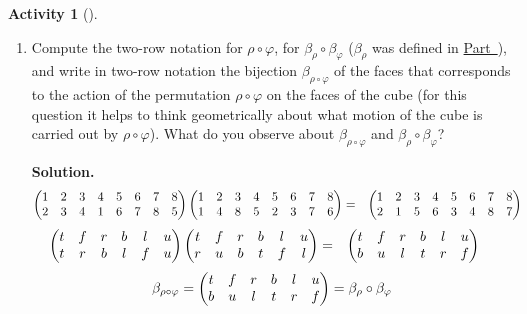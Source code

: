\documentclass[10pt,]{book}
\theoremstyle{plain}
\theoremstyle{definition}
\newtheorem{activity}[project]{Activity}
\numberwithin{equation}{chapter}
\newcommand{\amp}{&}
\begin{document}
\begin{activity}[]
\begin{enumerate}[label=(\alph*)]
~\par
\item Compute the two-row notation for \(\rho\circ\varphi\), for \(\beta_{\rho}\circ\beta_{\varphi}\) (\(\beta_{\rho}\) was defined in \hyperref[actsonparta]{Part~}), and write in two-row notation the bijection \(\beta_{\rho\circ\varphi}\) of the faces that corresponds to the action of the permutation \(\rho\circ\varphi\) on the faces of the cube (for this question it helps to think geometrically about what motion of the cube is carried out by \(\rho\circ\varphi\)).  What do you observe about \(\beta_{\rho\circ\varphi}\) and \(\beta_{\rho}\circ\beta_{\varphi}\)?%
\par\medskip\noindent%
\textbf{Solution.}\quad %
\begin{align*}
\begin{pmatrix}1\amp 2\amp 3\amp 4\amp 5\amp 6\amp 7\amp 8\cr
2\amp 3\amp 4\amp 1\amp 6\amp 7\amp 8\amp 5
\end{pmatrix} \begin{pmatrix}1\amp 2\amp 3\amp 4\amp 5\amp 6\amp 7\amp 8\cr1\amp 4\amp 8\amp 5\amp 2\amp 3\amp 7\amp 6
\end{pmatrix} \amp =\amp
\begin{pmatrix}1\amp 2\amp 3\amp 4\amp 5\amp 6\amp 7\amp 8\cr 2\amp 1\amp 5\amp 6\amp 3\amp 4\amp 8\amp 7
\end{pmatrix} \amp \amp
\end{align*}
%
\begin{align*}
\begin{pmatrix}t\amp f\amp r\amp b\amp l\amp u\cr t\amp r\amp b\amp l\amp f\amp u
\end{pmatrix} \begin{pmatrix}t\amp f\amp r\amp b\amp l\amp u\cr r\amp u\amp b\amp t\amp f\amp l
\end{pmatrix} \amp =\amp
\begin{pmatrix}t\amp f\amp r\amp b\amp l\amp u\cr b\amp u\amp l\amp t\amp r\amp f
\end{pmatrix} \amp \amp
\end{align*}
%
\begin{equation*}
\beta_{\rho\circ\varphi} =\begin{pmatrix}t\amp f\amp r\amp b\amp l\amp u\cr
b\amp u\amp l\amp t\amp r\amp f
\end{pmatrix} =\beta_{\rho}\circ\beta_{\varphi}
\end{equation*}
%

\end{enumerate}
\end{activity}
\end{document}
